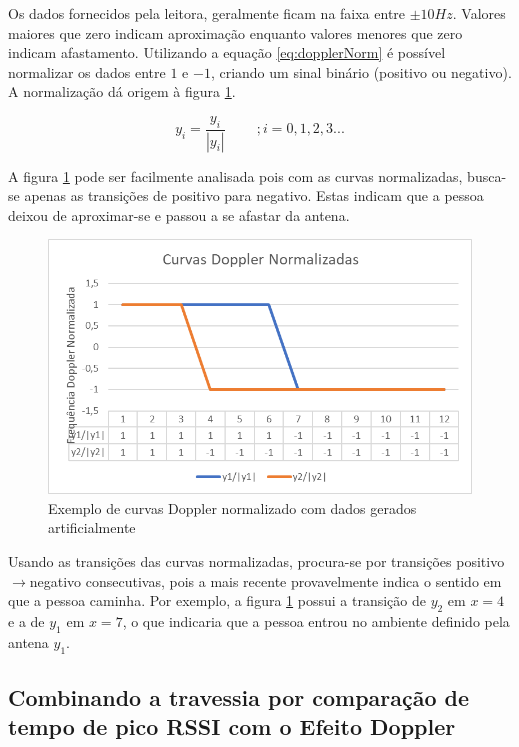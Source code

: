     Os dados fornecidos pela leitora, geralmente ficam na faixa entre $\pm 10 Hz$. Valores maiores que zero indicam aproximação enquanto valores menores que zero indicam afastamento. Utilizando a equação \ref{eq:dopplerNorm} é possível normalizar os dados entre $1$ e $-1$, criando um sinal binário (positivo ou negativo). A normalização dá origem à figura \ref{fig:Doppler_norm_MET}.
    
    \begin{equation}
        y_i = \frac{y_i}{|y_i|} \ \ \ \ \ \ \ \ \ \ ; i = 0, 1, 2, 3 ...
        \label{eq:dopplerNorm}
    \end{equation}

A figura \ref{fig:Doppler_norm_MET} pode ser facilmente analisada pois com as curvas normalizadas, busca-se apenas as transições de positivo para negativo. Estas indicam que a pessoa deixou de aproximar-se e passou a se afastar da antena.
 
  \begin{figure}[H]
    \centering
    \includegraphics[width=0.8\linewidth]{figs/Metodologia/image007.png}
    \caption{Exemplo de curvas Doppler normalizado com dados gerados artificialmente}
    \label{fig:Doppler_norm_MET}
\end{figure}

Usando as transições das curvas normalizadas, procura-se por transições positivo$\rightarrow$negativo consecutivas, pois a mais recente provavelmente indica o sentido em que a pessoa caminha. Por exemplo, a figura \ref{fig:Doppler_norm_MET} possui a transição de $y_2$ em $x=4$ e a de $y_1$ em $x=7$, o que indicaria que a pessoa entrou no ambiente definido pela antena $y_1$.
 
 \subsection{Combinando a travessia por comparação de tempo de pico RSSI com o Efeito Doppler} \label{section:RSSI+doppler_met}
 
